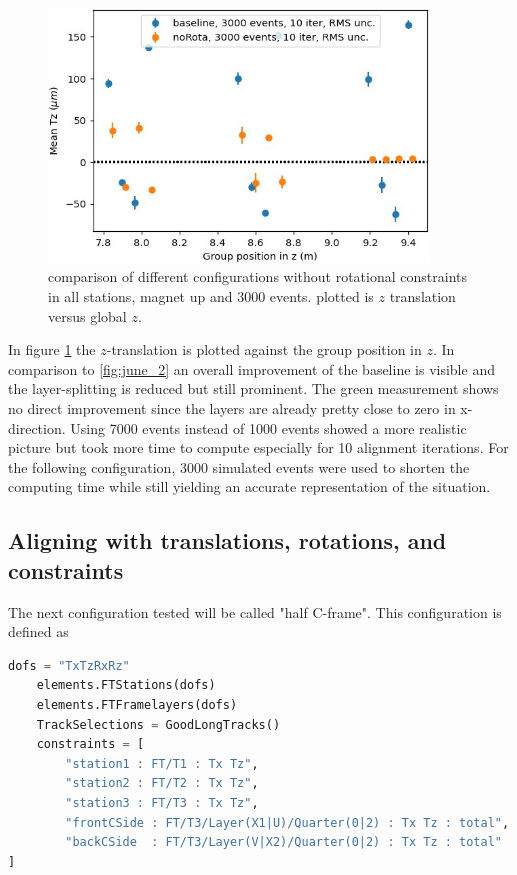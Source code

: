 \begin{figure}
  \centering
  \includegraphics[width=0.9\textwidth]{plots/renewed_plots/lxplus/4_4.jpeg}
  \caption{comparison of different configurations without rotational constraints in all stations, magnet up and 3000 events. plotted is $z$ translation versus global $z$.}
  \label{fig:june_2_1}
\end{figure}

In figure \ref{fig:june_2_1} the $z$-translation is plotted against the group position in $z$. In comparison to \ref{fig:june_2} an overall improvement of the baseline is visible and the layer-splitting is reduced but still prominent. The green measurement shows no direct improvement since the layers are already pretty close to zero in x-direction.
Using 7000 events instead of 1000 events showed a more realistic picture but
took more time to compute especially for 10 alignment iterations.
For the following configuration, 3000 simulated events were used to shorten the computing time while still yielding an accurate representation of the situation.

\subsection{Aligning with translations, rotations, and constraints}
The next configuration tested will be called "half C-frame". This configuration is defined as

\begin{lstlisting}[language=Python]
    dofs = "TxTzRxRz"
    elements.FTStations(dofs)
    elements.FTFramelayers(dofs)
    TrackSelections = GoodLongTracks()
    constraints = [
        "station1 : FT/T1 : Tx Tz",
        "station2 : FT/T2 : Tx Tz",
        "station3 : FT/T3 : Tx Tz",
        "frontCSide : FT/T3/Layer(X1|U)/Quarter(0|2) : Tx Tz : total",
        "backCSide  : FT/T3/Layer(V|X2)/Quarter(0|2) : Tx Tz : total"
]
\end{lstlisting}

